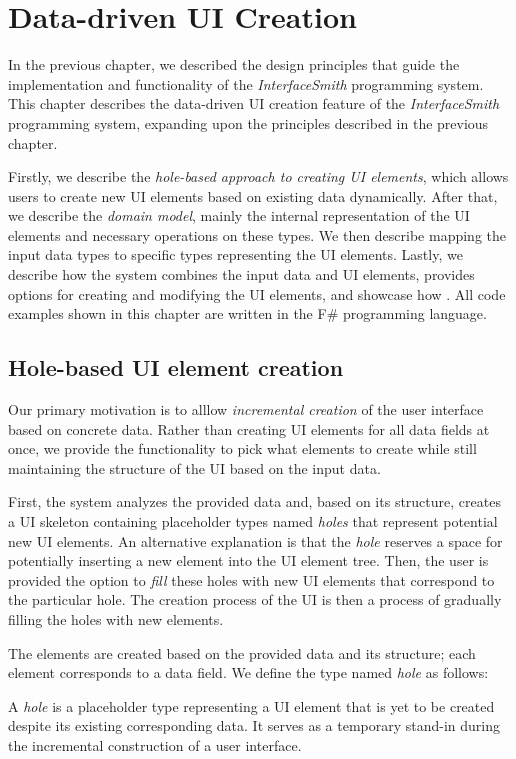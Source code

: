 \chapter{Data-driven UI Creation}
\label{chap:corelogic}

In the previous chapter, we described the design principles that guide the implementation and functionality of the \emph{InterfaceSmith} programming system.
This chapter describes the data-driven UI creation feature of the \emph{InterfaceSmith} programming system, expanding upon the principles described in the previous chapter.

Firstly, we describe the \emph{hole-based approach to creating UI elements}, which allows users to create new UI elements based on existing data dynamically.
After that, we describe the \emph{domain model}, mainly the internal representation of the UI elements and necessary operations on these types.
We then describe mapping the input data types to specific types representing the UI elements.
Lastly, we describe how the system combines the input data and UI elements, provides options for creating and modifying the UI elements, and showcase how .
All code examples shown in this chapter are written in the F\#\cite{fsharp} programming language.

\section{Hole-based UI element creation}
\label{sec:hole-based}
Our primary motivation is to alllow \emph{incremental creation} of the user interface based on concrete data.
Rather than creating UI elements for all data fields at once, we provide the functionality to pick what elements to create while still maintaining the structure of the UI based on the input data.

First, the system analyzes the provided data and, based on its structure, creates a UI skeleton containing placeholder types named \emph{holes} that represent potential new UI elements.
An alternative explanation is that the \emph{hole} reserves a space for potentially inserting a new element into the UI element tree.
Then, the user is provided the option to \emph{fill} these holes with new UI elements that correspond to the particular hole.
The creation process of the UI is then a process of gradually filling the holes with new elements.

The elements are created based on the provided data and its structure; each element corresponds to a data field.
We define the type named \emph{hole} as follows:
\begin{defn}
	A \emph{hole} is a placeholder type representing a UI element that is yet to be created despite its existing corresponding data.
	It serves as a temporary stand-in during the incremental construction of a user interface.
\end{defn}

